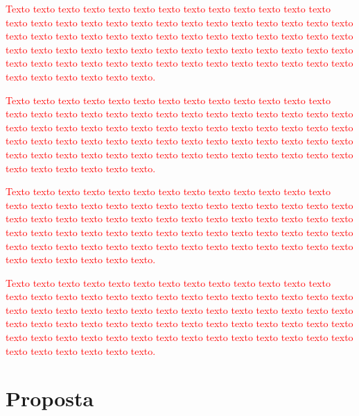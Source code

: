 \documentclass[normaltoc, espacoumemeio, pnumromarab,ruledheader]{abnt}
\begin{document}
\textcolor{red}{Texto texto texto texto texto texto texto texto texto texto texto texto texto texto texto texto texto texto texto texto texto texto texto texto texto texto texto texto texto texto texto texto texto texto texto texto texto texto texto texto texto texto texto texto texto texto texto texto texto texto texto texto texto texto texto texto texto texto texto texto texto texto texto texto texto texto texto texto texto texto texto texto texto texto texto.}

\textcolor{red}{Texto texto texto texto texto texto texto texto texto texto texto texto texto texto texto texto texto texto texto texto texto texto texto texto texto texto texto texto texto texto texto texto texto texto texto texto texto texto texto texto texto texto texto texto texto texto texto texto texto texto texto texto texto texto texto texto texto texto texto texto texto texto texto texto texto texto texto texto texto texto texto texto texto texto texto.}

\textcolor{red}{Texto texto texto texto texto texto texto texto texto texto texto texto texto texto texto texto texto texto texto texto texto texto texto texto texto texto texto texto texto texto texto texto texto texto texto texto texto texto texto texto texto texto texto texto texto texto texto texto texto texto texto texto texto texto texto texto texto texto texto texto texto texto texto texto texto texto texto texto texto texto texto texto texto texto texto.}

\textcolor{red}{Texto texto texto texto texto texto texto texto texto texto texto texto texto texto texto texto texto texto texto texto texto texto texto texto texto texto texto texto texto texto texto texto texto texto texto texto texto texto texto texto texto texto texto texto texto texto texto texto texto texto texto texto texto texto texto texto texto texto texto texto texto texto texto texto texto texto texto texto texto texto texto texto texto texto texto.}

\chapter{Proposta}

\end{document}
